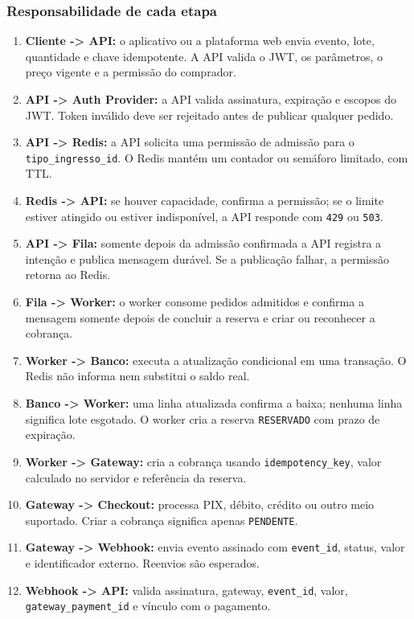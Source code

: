 \documentclass[12pt,a4paper]{article}
\begin{document}
\subsubsection*{Responsabilidade de cada etapa}
\begin{enumerate}
  \item \textbf{Cliente -> API:} o aplicativo ou a plataforma web envia evento, lote, quantidade e chave idempotente. A API valida o JWT, os par\^ametros, o pre\c{c}o vigente e a permiss\~ao do comprador.
  \item \textbf{API -> Auth Provider:} a API valida assinatura, expira\c{c}\~ao e escopos do JWT. Token inv\'alido deve ser rejeitado antes de publicar qualquer pedido.
  \item \textbf{API -> Redis:} a API solicita uma permiss\~ao de admiss\~ao para o \texttt{tipo\_ingresso\_id}. O Redis mant\'em um contador ou sem\'aforo limitado, com TTL.
  \item \textbf{Redis -> API:} se houver capacidade, confirma a permiss\~ao; se o limite estiver atingido ou estiver indispon\'ivel, a API responde com \texttt{429} ou \texttt{503}.
  \item \textbf{API -> Fila:} somente depois da admiss\~ao confirmada a API registra a inten\c{c}\~ao e publica mensagem dur\'avel. Se a publica\c{c}\~ao falhar, a permiss\~ao retorna ao Redis.
  \item \textbf{Fila -> Worker:} o worker consome pedidos admitidos e confirma a mensagem somente depois de concluir a reserva e criar ou reconhecer a cobran\c{c}a.
  \item \textbf{Worker -> Banco:} executa a atualiza\c{c}\~ao condicional em uma transa\c{c}\~ao. O Redis n\~ao informa nem substitui o saldo real.
  \item \textbf{Banco -> Worker:} uma linha atualizada confirma a baixa; nenhuma linha significa lote esgotado. O worker cria a reserva \texttt{RESERVADO} com prazo de expira\c{c}\~ao.
  \item \textbf{Worker -> Gateway:} cria a cobran\c{c}a usando \texttt{idempotency\_key}, valor calculado no servidor e refer\^encia da reserva.
  \item \textbf{Gateway -> Checkout:} processa PIX, d\'ebito, cr\'edito ou outro meio suportado. Criar a cobran\c{c}a significa apenas \texttt{PENDENTE}.
  \item \textbf{Gateway -> Webhook:} envia evento assinado com \texttt{event\_id}, status, valor e identificador externo. Reenvios s\~ao esperados.
  \item \textbf{Webhook -> API:} valida assinatura, gateway, \texttt{event\_id}, valor, \texttt{gateway\_payment\_id} e v\'inculo com o pagamento.

\end{enumerate}
\end{document}
